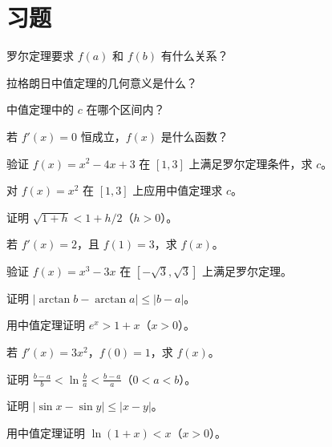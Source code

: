 \section{习题}
\begin{exercise}[0] 罗尔定理要求 \(f(a)\) 和 \(f(b)\) 有什么关系？\end{exercise}
\begin{exercise}[0] 拉格朗日中值定理的几何意义是什么？\end{exercise}
\begin{exercise}[0] 中值定理中的 \(c\) 在哪个区间内？\end{exercise}
\begin{exercise}[0] 若 \(f'(x)=0\) 恒成立，\(f(x)\) 是什么函数？\end{exercise}
\begin{exercise}[1] 验证 \(f(x)=x^2-4x+3\) 在 \([1,3]\) 上满足罗尔定理条件，求 \(c\)。\end{exercise}
\begin{exercise}[1] 对 \(f(x)=x^2\) 在 \([1,3]\) 上应用中值定理求 \(c\)。\end{exercise}
\begin{exercise}[1] 证明 \(\sqrt{1+h} < 1 + h/2\)（\(h>0\)）。\end{exercise}
\begin{exercise}[1] 若 \(f'(x)=2\)，且 \(f(1)=3\)，求 \(f(x)\)。\end{exercise}
\begin{exercise}[2] 验证 \(f(x)=x^3-3x\) 在 \([-\sqrt{3},\sqrt{3}]\) 上满足罗尔定理。\end{exercise}
\begin{exercise}[2] 证明 \(|\arctan b - \arctan a| \le |b-a|\)。\end{exercise}
\begin{exercise}[2] 用中值定理证明 \(e^x > 1+x\)（\(x>0\)）。\end{exercise}
\begin{exercise}[2] 若 \(f'(x)=3x^2\)，\(f(0)=1\)，求 \(f(x)\)。\end{exercise}
\begin{exercise}[3] 证明 \(\frac{b-a}{b} < \ln\frac{b}{a} < \frac{b-a}{a}\)（\(0<a<b\)）。\end{exercise}
\begin{exercise}[3] 证明 \(|\sin x - \sin y| \le |x-y|\)。\end{exercise}
\begin{exercise}[3] 用中值定理证明 \(\ln(1+x) < x\)（\(x>0\)）。\end{exercise}
